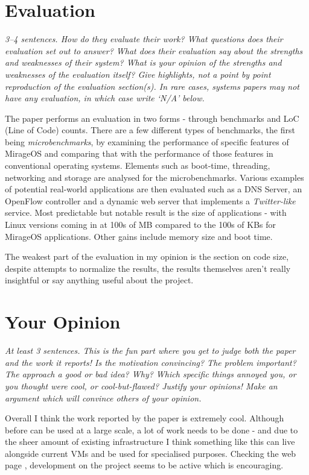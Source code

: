 \documentclass[11pt]{article}
\begin{document}
\section*{Evaluation}

\textsl{3--4 sentences. How do they evaluate their work? What questions does
their evaluation set out to answer? What does their evaluation say about the
strengths and weaknesses of their system? What is your opinion of the strengths
and weaknesses of the evaluation itself? Give highlights, not a point by point
reproduction of the evaluation section(s). In rare cases, systems papers may
not have any evaluation, in which case write `N/A' below.}

The paper performs an evaluation in two forms - through benchmarks and LoC
(Line of Code) counts. There are a few different types of benchmarks, the first
being \textit{microbenchmarks}, by examining the performance of specific
features of MirageOS and comparing that with the performance of those features
in conventional operating systems. Elements such as boot-time, threading,
networking and storage are analysed for the microbenchmarks. Various examples
of potential real-world applications are then evaluated such as a DNS Server,
an OpenFlow controller and a dynamic web server that implements a
\textit{Twitter-like} service. Most predictable but notable result is the size
of applications - with Linux versions coming in at 100s of MB compared to the
100s of KBs for MirageOS applications. Other gains include memory size and boot
time.

The weakest part of the evaluation in my opinion is the section on code size,
despite attempts to normalize the results, the results themselves aren't really
insightful or say anything useful about the project.

\section*{Your Opinion}

\textsl{At least 3 sentences. This is the fun part where you get to judge both
the paper and the work it reports! Is the motivation convincing? The problem
important? The approach a good or bad idea? Why? Which specific things annoyed
you, or you thought were cool, or cool-but-flawed? Justify your opinions! Make
an argument which will convince others of your opinion.}

Overall I think the work reported by the paper is extremely cool. Although
before can be used at a large scale, a lot of work needs to be done - and due
to the sheer amount of existing infrastructure I think something like this can
live alongside current VMs and be used for specialised purposes. Checking the
web page \cite{MirageOSWeb}, development on the project seems to be active which
is encouraging.
\end{document}
